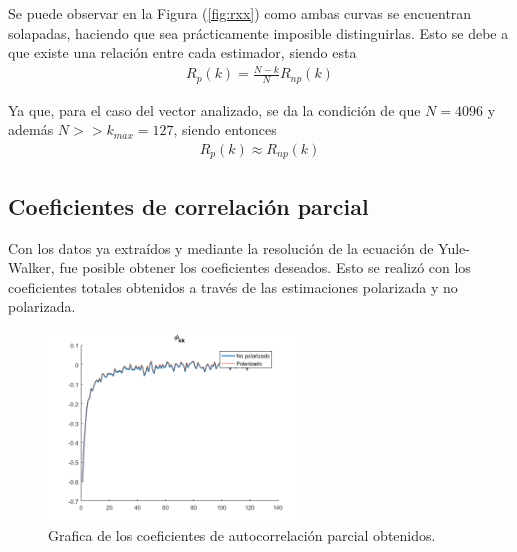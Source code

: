 Se puede observar en la Figura (\ref{fig:rxx}) como ambas curvas se encuentran solapadas, haciendo que sea prácticamente imposible distinguirlas.
Esto se debe a que existe una relación entre cada estimador, siendo esta
\begin{equation*}
\begin{gathered}
	R_{p}(k) = \frac{N - k}{N} R_{np}(k)
\end{gathered}
\end{equation*}

Ya que, para el caso del vector analizado, se da la condición de que $N = 4096$ y además $N >> k_{max} = 127$, siendo entonces
\begin{equation*}
\begin{gathered}
	R_{p}(k) \approx R_{np}(k)
\end{gathered}
\end{equation*}

\subsection{Coeficientes de correlación parcial}

Con los datos ya extraídos y mediante la resolución de la ecuación de Yule-Walker, fue posible obtener los coeficientes deseados. Esto se realizó con los coeficientes totales obtenidos a través de las estimaciones polarizada y no polarizada.
\begin{figure}[H]
\centering
	\includegraphics[width=0.6\textwidth, trim = {0 0 0 0.7cm},clip]{./ImagenesEjercicio2/phikk.png}
	\caption{Grafica de los coeficientes de autocorrelación parcial obtenidos.}
	\label{fig:phikk}
\end{figure}


